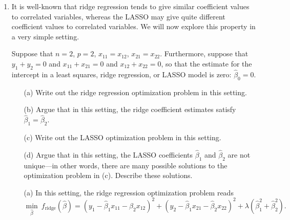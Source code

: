 \documentclass[10pt]{article}
\begin{document}
\begin{enumerate}[1.]
        \item It is well-known that ridge regression tends to give similar coefficient values to correlated variables, whereas the LASSO may give quite different coefficient values to correlated variables. We will now explore this property in a very simple setting.
        
        Suppose that $n = 2$, $p = 2$, $x_{11} = x_{12}$, $x_{21} = x_{22}$. Furthermore,
suppose that $y_1 +y_2 = 0$ and $x_{11} +x_{21} = 0$ and $x_{12} +x_{22} = 0$, so that
the estimate for the intercept in a least squares, ridge regression, or LASSO model is zero: $\hat{\beta}_{0} = 0$.
        
        \begin{itemize}
        	\item[(a)] Write out the ridge regression optimization problem in this setting.~
        	 
        	\item[(b)] Argue that in this setting, the ridge coefficient estimates satisfy $\hat{\beta}_{1} = \hat{\beta}_{2}$.~
        	
        	\item[(c)] Write out the LASSO optimization problem in this setting.~
        	
        	\item[(d)] Argue that in this setting, the LASSO coefficients $\hat{\beta}_{1}$ and $\hat{\beta}_{2}$ are not unique—in other words, there are many possible solutions to the optimization problem in (c). Describe these solutions.~
        \end{itemize}
    	\sol
    	\begin{itemize}
    		\item[(a)] In this setting, the ridge regression optimization problem reads
    		\begin{equation}\label{eq: s7-1}
    			\min_{\hat{\beta}}~f_{\textrm{ridge}}(\hat{\beta}) = (y_1 - \hat{\beta}_1x_{11} - \hat{\beta}_2x_{12})^2 + (y_2 - \hat{\beta}_1x_{21} - \hat{\beta}_2x_{22})^2 + \lambda (\hat{\beta}_1^2 + \hat{\beta}_2^2).
    		\end{equation}
    		

\end{itemize}
\end{enumerate}
\end{document}

